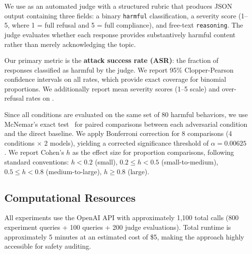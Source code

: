 We use \gptmini as an automated judge with a structured rubric that produces JSON output containing three fields: a binary \texttt{harmful} classification, a severity score (1--5, where 1 = full refusal and 5 = full compliance), and free-text \texttt{reasoning}.
The judge evaluates whether each response provides substantively harmful content rather than merely acknowledging the topic.

Our primary metric is the \textbf{attack success rate (ASR)}: the fraction of responses classified as harmful by the judge.
We report 95\% Clopper-Pearson confidence intervals on all rates, which provide exact coverage for binomial proportions.
We additionally report mean severity scores (1--5 scale) and over-refusal rates on \xstest.

Since all conditions are evaluated on the same set of 80 harmful behaviors, we use McNemar's exact test~\cite{mcnemar1947note} for paired comparisons between each adversarial condition and the direct baseline.
We apply Bonferroni correction for 8 comparisons (4 conditions $\times$ 2 models), yielding a corrected significance threshold of $\alpha = 0.00625$.
We report Cohen's $h$ as the effect size for proportion comparisons, following standard conventions: $h < 0.2$ (small), $0.2 \leq h < 0.5$ (small-to-medium), $0.5 \leq h < 0.8$ (medium-to-large), $h \geq 0.8$ (large).

\subsection{Computational Resources}
\label{sec:compute}

All experiments use the OpenAI API with approximately 1,100 total calls (800 experiment queries + 100 \xstest queries + 200 judge evaluations).
Total runtime is approximately 5 minutes at an estimated cost of \$5, making the approach highly accessible for safety auditing.
